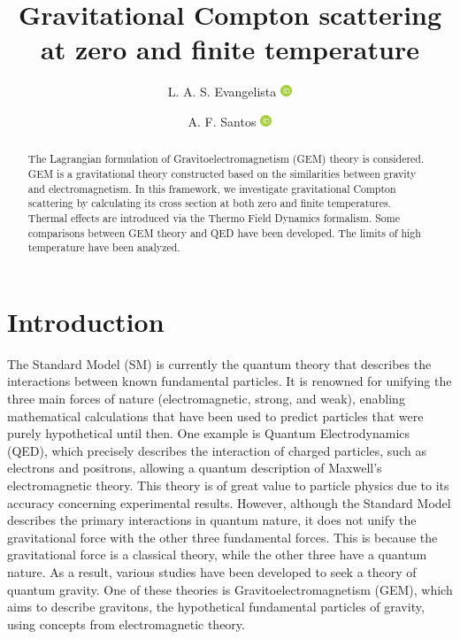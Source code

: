 \documentclass[11pt,showpacs,preprintnumbers,amsmath,amssymb,prd,nofootinbib,superscriptaddress]{revtex4-2}
\newcommand{\orcid}[1]{\href{https://orcid.org/#1}{\includegraphics[width=10pt]{orcid}}}
\begin{document}
\title{ Gravitational Compton scattering at zero and finite temperature }

\author{L. A. S. Evangelista \orcid{0009-0002-3136-2234}}

\author{A. F. Santos \orcid{0000-0002-2505-5273}}




\begin{abstract}

The Lagrangian formulation of Gravitoelectromagnetism (GEM) theory is considered. GEM is a gravitational theory constructed based on the similarities between gravity and electromagnetism. In this framework, we investigate gravitational Compton scattering by calculating its cross section at both zero and finite temperatures. Thermal effects are introduced via the Thermo Field Dynamics formalism. Some comparisons between GEM theory and QED have been developed. The limits of high temperature have been analyzed.

\end{abstract}


\maketitle

\section{Introduction}


The Standard Model (SM) is currently the quantum theory that describes the interactions between known fundamental particles. It is renowned for unifying the three main forces of nature (electromagnetic, strong, and weak), enabling mathematical calculations that have been used to predict particles that were purely hypothetical until then. One example is Quantum Electrodynamics (QED), which precisely describes the interaction of charged particles, such as electrons and positrons, allowing a quantum description of Maxwell's electromagnetic theory. This theory is of great value to particle physics due to its accuracy concerning experimental results. However, although the Standard Model describes the primary interactions in quantum nature, it does not unify the gravitational force with the other three fundamental forces. This is because the gravitational force is a classical theory, while the other three have a quantum nature. As a result, various studies have been developed to seek a theory of quantum gravity. One of these theories is Gravitoelectromagnetism (GEM), which aims to describe gravitons, the hypothetical fundamental particles of gravity, using concepts from electromagnetic theory.
\end{document}
